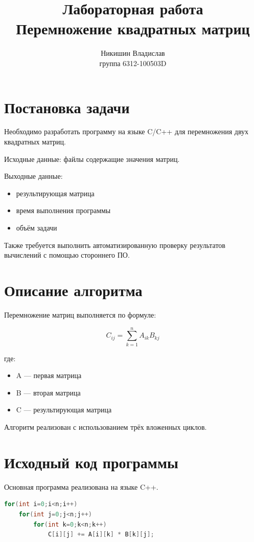 \documentclass[a4paper,12pt]{article}
\title{Лабораторная работа \\ Перемножение квадратных матриц}
\author{Никишин Владислав \\ группа 6312-100503D}
\date{}
\begin{document}
\maketitle

\section{Постановка задачи}

Необходимо разработать программу на языке C/C++ для перемножения двух квадратных матриц.

Исходные данные: файлы содержащие значения матриц.

Выходные данные:
\begin{itemize}
\item результирующая матрица
\item время выполнения программы
\item объём задачи
\end{itemize}

Также требуется выполнить автоматизированную проверку результатов вычислений с помощью стороннего ПО.

\section{Описание алгоритма}

Перемножение матриц выполняется по формуле:

\[
C_{ij} = \sum_{k=1}^{n} A_{ik} B_{kj}
\]

где:

\begin{itemize}
\item A — первая матрица
\item B — вторая матрица
\item C — результирующая матрица
\end{itemize}

Алгоритм реализован с использованием трёх вложенных циклов.

\section{Исходный код программы}

Основная программа реализована на языке C++.

\begin{lstlisting}[language=C++]
for(int i=0;i<n;i++)
    for(int j=0;j<n;j++)
        for(int k=0;k<n;k++)
            C[i][j] += A[i][k] * B[k][j];
\end{lstlisting}
\end{document}

